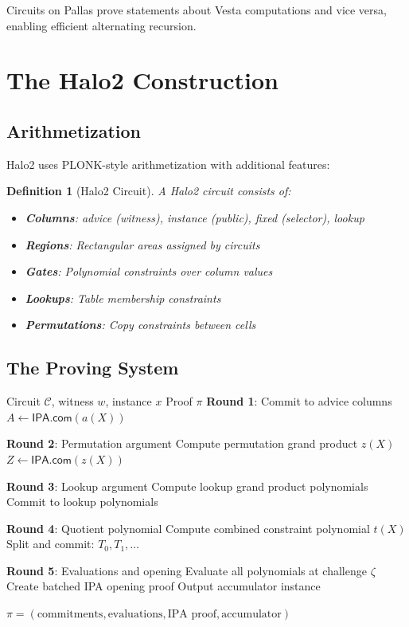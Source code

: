 \documentclass[11pt,a4paper]{article}
\newtheorem{definition}[theorem]{Definition}
\newcommand{\IPA}{\mathsf{IPA}}
\newcommand{\com}{\mathsf{com}}
\begin{document}
Circuits on Pallas prove statements about Vesta computations and vice versa, enabling efficient alternating recursion.

\section{The Halo2 Construction}
\label{sec:halo2}

\subsection{Arithmetization}

Halo2 uses PLONK-style arithmetization with additional features:

\begin{definition}[Halo2 Circuit]
A Halo2 circuit consists of:
\begin{itemize}
    \item \textbf{Columns}: advice (witness), instance (public), fixed (selector), lookup
    \item \textbf{Regions}: Rectangular areas assigned by circuits
    \item \textbf{Gates}: Polynomial constraints over column values
    \item \textbf{Lookups}: Table membership constraints
    \item \textbf{Permutations}: Copy constraints between cells
\end{itemize}
\end{definition}

\subsection{The Proving System}

\begin{algorithm}
\caption{Halo2 Prover (Simplified)}
\label{alg:halo2-prove}
\begin{algorithmic}[1]
\Require Circuit $\mathcal{C}$, witness $w$, instance $x$
\Ensure Proof $\pi$
\State \textbf{Round 1}: Commit to advice columns
    \State $A \gets \IPA.\com(a(X))$
\EndFor

\State \textbf{Round 2}: Permutation argument
\State Compute permutation grand product $z(X)$
\State $Z \gets \IPA.\com(z(X))$

\State \textbf{Round 3}: Lookup argument
\State Compute lookup grand product polynomials
\State Commit to lookup polynomials

\State \textbf{Round 4}: Quotient polynomial
\State Compute combined constraint polynomial $t(X)$
\State Split and commit: $T_0, T_1, \ldots$

\State \textbf{Round 5}: Evaluations and opening
\State Evaluate all polynomials at challenge $\zeta$
\State Create batched IPA opening proof
\State Output accumulator instance

\State \Return $\pi = (\text{commitments}, \text{evaluations}, \text{IPA proof}, \text{accumulator})$
\end{algorithmic}
\end{algorithm}
\end{document}
